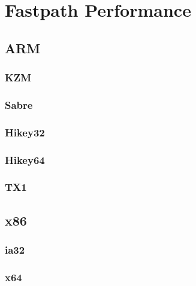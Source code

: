 \chapter{Fastpath Performance}
\label{appendix:fastpath-performance}
\section{ARM}
\subsection{KZM}

\clearpage
\subsection{Sabre}

\clearpage
\subsection{Hikey32}

\clearpage
\subsection{Hikey64}

\clearpage
\subsection{TX1}

\clearpage
\section{x86}
\subsection{ia32}

\clearpage
\subsection{x64}

